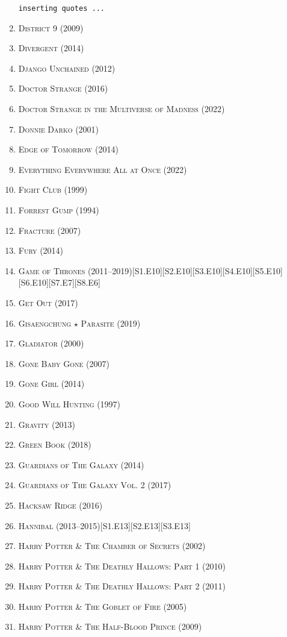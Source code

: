 \documentclass{article}
\numberwithin{equation}{section}
\begin{document}
\begin{enumerate}
	\texttt{inserting quotes ...}
	\item \textsc{District 9} (2009)
	\item \textsc{Divergent} (2014)
	\item \textsc{Django Unchained} (2012)
	\item \textsc{Doctor Strange} (2016)
	\item \textsc{Doctor Strange in the Multiverse of Madness} (2022)
	\item \textsc{Donnie Darko} (2001)
	\item \textsc{Edge of Tomorrow} (2014)
	\item \textsc{Everything Everywhere All at Once} (2022)
	\item \textsc{Fight Club} (1999)
	\item \textsc{Forrest Gump} (1994)
	\item \textsc{Fracture} (2007)
	\item \textsc{Fury} (2014)
	\item \textsc{Game of Thrones} (2011--2019)\hfill[S1.E10][S2.E10][S3.E10][S4.E10][S5.E10][S6.E10][S7.E7][S8.E6]
	\item \textsc{Get Out} (2017)
	\item \textsc{Gisaengchung $\star$ Parasite} (2019)
	\item \textsc{Gladiator} (2000)
	\item \textsc{Gone Baby Gone} (2007)
	\item \textsc{Gone Girl} (2014)
	\item \textsc{Good Will Hunting} (1997)
	\item \textsc{Gravity} (2013)
	\item \textsc{Green Book} (2018)
	\item \textsc{Guardians of The Galaxy} (2014)
	\item \textsc{Guardians of The Galaxy Vol. 2} (2017)
	\item \textsc{Hacksaw Ridge} (2016)
	\item \textsc{Hannibal} (2013--2015)\hfill[S1.E13][S2.E13][S3.E13]
	\item \textsc{Harry Potter \& The Chamber of Secrets} (2002)
	\item \textsc{Harry Potter \& The Deathly Hallows: Part 1} (2010)
	\item \textsc{Harry Potter \& The Deathly Hallows: Part 2} (2011)
	\item \textsc{Harry Potter \& The Goblet of Fire} (2005)
	\item \textsc{Harry Potter \& The Half-Blood Prince} (2009)

\end{enumerate}
\end{document}
